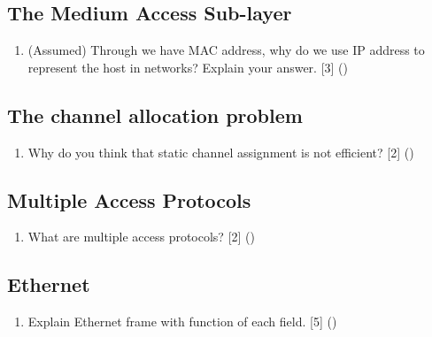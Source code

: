 \documentclass[12pt]{article}
\begin{document}
	\subsection{The Medium Access Sub-layer}
		\begin{enumerate}[noitemsep, topsep=0pt]
			\item (Assumed) Through we have MAC address, why do we use IP address to represent the host in networks? Explain your answer. \hfill [3] ()
		\end{enumerate}

	\subsection{The channel allocation problem}
		\begin{enumerate}[noitemsep, topsep=0pt]
			\item Why do you think that static channel assignment is not efficient? \hfill [2] () 
		\end{enumerate}

	\subsection{Multiple Access Protocols}
		\begin{enumerate}[noitemsep, topsep=0pt]
			\item What are multiple access protocols? \hfill [2] ()
		\end{enumerate}

	\subsection{Ethernet}
		\begin{enumerate}
			\item Explain Ethernet frame with function of each field. \hfill [5] ()
		\end{enumerate}
\end{document}
